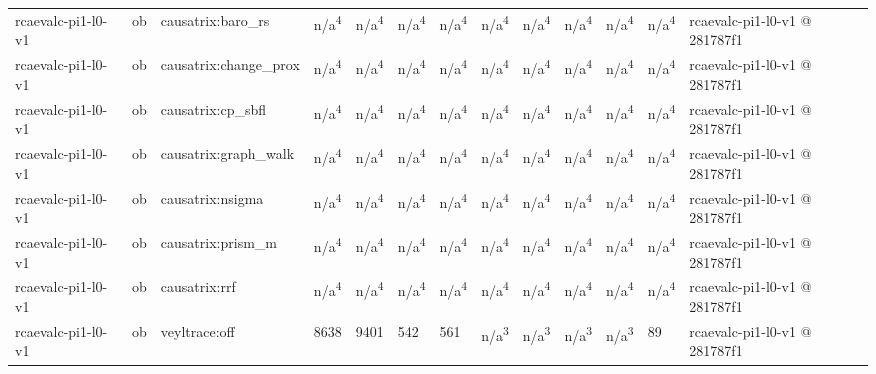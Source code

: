\begin{table}[t]
\begin{tabular}{lllllllllllll}
rcaevalc-pi1-l0-v1 & ob & causatrix:baro\_rs & n/a\textsuperscript{4} & n/a\textsuperscript{4} & n/a\textsuperscript{4} & n/a\textsuperscript{4} & n/a\textsuperscript{4} & n/a\textsuperscript{4} & n/a\textsuperscript{4} & n/a\textsuperscript{4} & n/a\textsuperscript{4} & rcaevalc-pi1-l0-v1 @ 281787f1 \\
rcaevalc-pi1-l0-v1 & ob & causatrix:change\_prox & n/a\textsuperscript{4} & n/a\textsuperscript{4} & n/a\textsuperscript{4} & n/a\textsuperscript{4} & n/a\textsuperscript{4} & n/a\textsuperscript{4} & n/a\textsuperscript{4} & n/a\textsuperscript{4} & n/a\textsuperscript{4} & rcaevalc-pi1-l0-v1 @ 281787f1 \\
rcaevalc-pi1-l0-v1 & ob & causatrix:cp\_sbfl & n/a\textsuperscript{4} & n/a\textsuperscript{4} & n/a\textsuperscript{4} & n/a\textsuperscript{4} & n/a\textsuperscript{4} & n/a\textsuperscript{4} & n/a\textsuperscript{4} & n/a\textsuperscript{4} & n/a\textsuperscript{4} & rcaevalc-pi1-l0-v1 @ 281787f1 \\
rcaevalc-pi1-l0-v1 & ob & causatrix:graph\_walk & n/a\textsuperscript{4} & n/a\textsuperscript{4} & n/a\textsuperscript{4} & n/a\textsuperscript{4} & n/a\textsuperscript{4} & n/a\textsuperscript{4} & n/a\textsuperscript{4} & n/a\textsuperscript{4} & n/a\textsuperscript{4} & rcaevalc-pi1-l0-v1 @ 281787f1 \\
rcaevalc-pi1-l0-v1 & ob & causatrix:nsigma & n/a\textsuperscript{4} & n/a\textsuperscript{4} & n/a\textsuperscript{4} & n/a\textsuperscript{4} & n/a\textsuperscript{4} & n/a\textsuperscript{4} & n/a\textsuperscript{4} & n/a\textsuperscript{4} & n/a\textsuperscript{4} & rcaevalc-pi1-l0-v1 @ 281787f1 \\
rcaevalc-pi1-l0-v1 & ob & causatrix:prism\_m & n/a\textsuperscript{4} & n/a\textsuperscript{4} & n/a\textsuperscript{4} & n/a\textsuperscript{4} & n/a\textsuperscript{4} & n/a\textsuperscript{4} & n/a\textsuperscript{4} & n/a\textsuperscript{4} & n/a\textsuperscript{4} & rcaevalc-pi1-l0-v1 @ 281787f1 \\
rcaevalc-pi1-l0-v1 & ob & causatrix:rrf & n/a\textsuperscript{4} & n/a\textsuperscript{4} & n/a\textsuperscript{4} & n/a\textsuperscript{4} & n/a\textsuperscript{4} & n/a\textsuperscript{4} & n/a\textsuperscript{4} & n/a\textsuperscript{4} & n/a\textsuperscript{4} & rcaevalc-pi1-l0-v1 @ 281787f1 \\
rcaevalc-pi1-l0-v1 & ob & veyltrace:off & 8638 & 9401 & 542 & 561 & n/a\textsuperscript{3} & n/a\textsuperscript{3} & n/a\textsuperscript{3} & n/a\textsuperscript{3} & 89 & rcaevalc-pi1-l0-v1 @ 281787f1 \\

\end{tabular}
\end{table}

